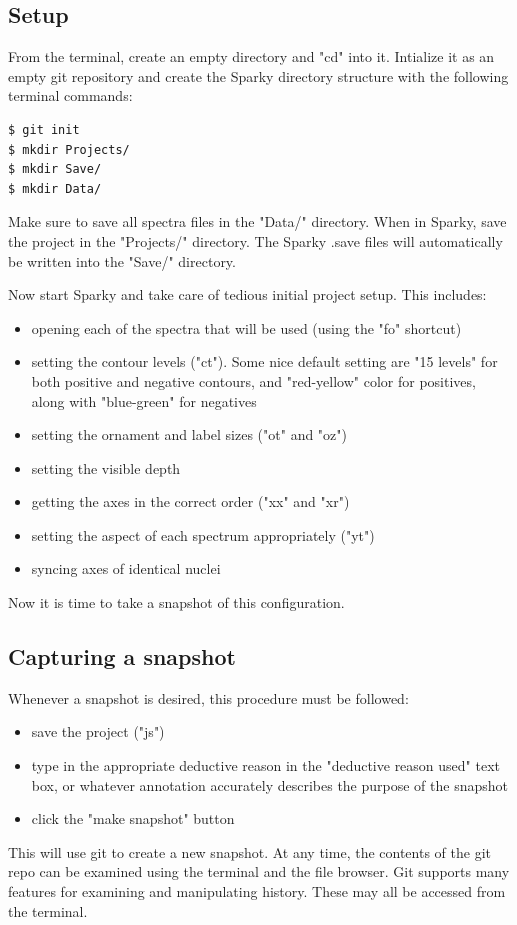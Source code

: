 \subsection{Setup}
From the terminal, create an empty directory and "cd" into it.
Intialize it as an empty git repository and create the Sparky directory
structure with the following terminal commands:
\begin{verbatim}
$ git init
$ mkdir Projects/
$ mkdir Save/
$ mkdir Data/
\end{verbatim} 
Make sure to save all spectra files in the "Data/" directory.
When in Sparky, save the project in the "Projects/" directory.
The Sparky .save files will automatically be written into the "Save/"
directory.

Now start Sparky and take care of tedious initial project setup.  This includes:
\begin{itemize}
  \item opening each of the spectra that will be used (using the "fo" shortcut)
  \item setting the contour levels ("ct").  Some nice default setting are
    "15 levels" for both positive and negative contours, and "red-yellow" color
    for positives, along with "blue-green" for negatives
  \item setting the ornament and label sizes ("ot" and "oz")
  \item setting the visible depth
  \item getting the axes in the correct order ("xx" and "xr")
  \item setting the aspect of each spectrum appropriately ("yt")
  \item syncing axes of identical nuclei
\end{itemize}
Now it is time to take a snapshot of this configuration.

\subsection{Capturing a snapshot}
Whenever a snapshot is desired, this procedure must be followed:
\begin{itemize}
  \item save the project ("js")
  \item type in the appropriate deductive reason in the "deductive reason used"
    text box, or whatever annotation accurately describes the purpose of the 
    snapshot
  \item click the "make snapshot" button
\end{itemize}
This will use git to create a new snapshot.  At any time, the contents of
the git repo can be examined using the terminal and the file browser.  Git
supports many features for examining and manipulating history.  These may
all be accessed from the terminal.

